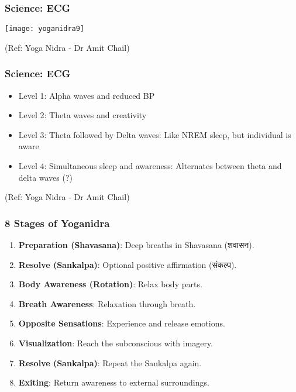 \begin{frame}[fragile]\frametitle{Science: ECG}
      \begin{center}
        \texttt{[image: yoganidra9]}

		{\tiny (Ref: Yoga Nidra - Dr Amit Chail)}		
        \end{center}

\end{frame}

\begin{frame}[fragile]\frametitle{Science: ECG}


    \begin{itemize}
        \item Level 1: Alpha waves and reduced BP
        \item Level 2: Theta waves and creativity
        \item Level 3: Theta followed by Delta waves: Like NREM sleep, but individual is aware
        \item Level 4: Simultaneous sleep and awareness: Alternates between theta and delta waves (?)
    \end{itemize}
	
		{\tiny (Ref: Yoga Nidra - Dr Amit Chail)}		

\end{frame}



\begin{frame}[fragile]\frametitle{8 Stages of Yoganidra}
    \begin{enumerate}
        \item \textbf{Preparation (Shavasana)}: Deep breaths in Shavasana (शवासन).
        \item \textbf{Resolve (Sankalpa)}: Optional positive affirmation (संकल्प).
        \item \textbf{Body Awareness (Rotation)}: Relax body parts.
        \item \textbf{Breath Awareness}: Relaxation through breath.
        \item \textbf{Opposite Sensations}: Experience and release emotions.
        \item \textbf{Visualization}: Reach the subconscious with imagery.
        \item \textbf{Resolve (Sankalpa)}: Repeat the Sankalpa again.
        \item \textbf{Exiting}: Return awareness to external surroundings.
    \end{enumerate}
\end{frame}

